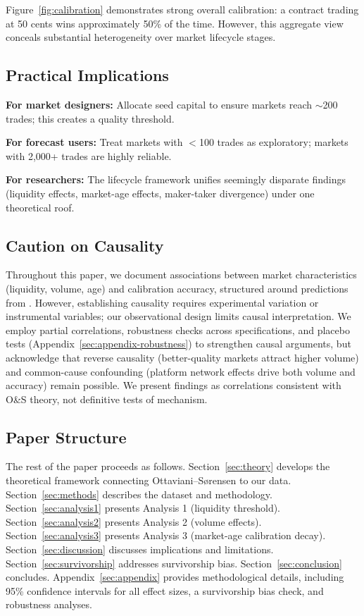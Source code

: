 \documentclass[12pt,letterpaper]{article}
\begin{document}
Figure~\ref{fig:calibration} demonstrates strong overall calibration: a contract trading at 50 cents wins approximately 50\% of the time. However, this aggregate view conceals substantial heterogeneity over market lifecycle stages.

\subsection{Practical Implications}

\textbf{For market designers:} Allocate seed capital to ensure markets reach $\sim$200 trades; this creates a quality threshold.

\textbf{For forecast users:} Treat markets with $<$100 trades as exploratory; markets with 2,000+ trades are highly reliable.

\textbf{For researchers:} The lifecycle framework unifies seemingly disparate findings (liquidity effects, market-age effects, maker-taker divergence) under one theoretical roof.

\subsection{Caution on Causality}

Throughout this paper, we document associations between market characteristics (liquidity, volume, age) and calibration accuracy, structured around predictions from \citet{ottaviani2007outcomes}. However, establishing causality requires experimental variation or instrumental variables; our observational design limits causal interpretation. We employ partial correlations, robustness checks across specifications, and placebo tests (Appendix~\ref{sec:appendix-robustness}) to strengthen causal arguments, but acknowledge that reverse causality (better-quality markets attract higher volume) and common-cause confounding (platform network effects drive both volume and accuracy) remain possible. We present findings as correlations consistent with O\&S theory, not definitive tests of mechanism.

\subsection{Paper Structure}

The rest of the paper proceeds as follows. Section~\ref{sec:theory} develops the theoretical framework connecting Ottaviani--S{\o}rensen to our data. Section~\ref{sec:methods} describes the dataset and methodology. Section~\ref{sec:analysis1} presents Analysis 1 (liquidity threshold). Section~\ref{sec:analysis2} presents Analysis 2 (volume effects). Section~\ref{sec:analysis3} presents Analysis 3 (market-age calibration decay). Section~\ref{sec:discussion} discusses implications and limitations. Section~\ref{sec:survivorship} addresses survivorship bias. Section~\ref{sec:conclusion} concludes. Appendix~\ref{sec:appendix} provides methodological details, including 95\% confidence intervals for all effect sizes, a survivorship bias check, and robustness analyses.
\end{document}
